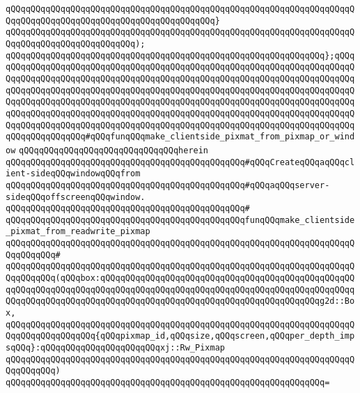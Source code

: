 \verb|qQQqqQQqqQQqqQQqqQQqqQQqqQQqqQQqqQQqqQQqqQQqqQQqqQQqqQQqqQQqqQQqqQQqqQQqqQQqqQQqqQQqqQQqqQQqqQQqqQQqqQQqqQQqqQQq}|\newline
\verb|qQQqqQQqqQQqqQQqqQQqqQQqqQQqqQQqqQQqqQQqqQQqqQQqqQQqqQQqqQQqqQQqqQQqqQQqqQQqqQQqqQQqqQQqqQQqqQQq);|\newline
\verb|qQQqqQQqqQQqqQQqqQQqqQQqqQQqqQQqqQQqqQQqqQQqqQQqqQQqqQQqqQQqqQQq};qQQqqQQqqQQqqQQqqQQqqQQqqQQqqQQqqQQqqQQqqQQqqQQqqQQqqQQqqQQqqQQqqQQqqQQqqQQqqQQqqQQqqQQqqQQqqQQqqQQqqQQqqQQqqQQqqQQqqQQqqQQqqQQqqQQqqQQqqQQqqQQqqQQqqQQqqQQqqQQqqQQqqQQqqQQqqQQqqQQqqQQqqQQqqQQqqQQqqQQqqQQqqQQqqQQqqQQqqQQqqQQqqQQqqQQqqQQqqQQqqQQqqQQqqQQqqQQqqQQqqQQqqQQqqQQqqQQqqQQqqQQqqQQqqQQqqQQqqQQqqQQqqQQqqQQqqQQqqQQqqQQqqQQqqQQqqQQqqQQqqQQqqQQqqQQqqQQqqQQqqQQqqQQqqQQqqQQqqQQqqQQqqQQqqQQqqQQqqQQqqQQqqQQqqQQqqQQqqQQqqQQqqQQqqQQqqQQqqQQq#qQQqfunqQQqmake_clientside_pixmat_from_pixmap_or_window|\newline
\newline
\verb|qQQqqQQqqQQqqQQqqQQqqQQqqQQqqQQqherein|\newline
\newline
\verb|qQQqqQQqqQQqqQQqqQQqqQQqqQQqqQQqqQQqqQQqqQQqqQQq#qQQqCreateqQQqaqQQqclient-sideqQQqwindowqQQqfrom|\newline
\verb|qQQqqQQqqQQqqQQqqQQqqQQqqQQqqQQqqQQqqQQqqQQqqQQq#qQQqaqQQqserver-sideqQQqoffscreenqQQqwindow.|\newline
\verb|qQQqqQQqqQQqqQQqqQQqqQQqqQQqqQQqqQQqqQQqqQQqqQQq#|\newline
\verb|qQQqqQQqqQQqqQQqqQQqqQQqqQQqqQQqqQQqqQQqqQQqqQQqfunqQQqmake_clientside_pixmat_from_readwrite_pixmap|\newline
\verb|qQQqqQQqqQQqqQQqqQQqqQQqqQQqqQQqqQQqqQQqqQQqqQQqqQQqqQQqqQQqqQQqqQQqqQQqqQQqqQQq#|\newline
\verb|qQQqqQQqqQQqqQQqqQQqqQQqqQQqqQQqqQQqqQQqqQQqqQQqqQQqqQQqqQQqqQQqqQQqqQQqqQQqqQQq(qQQqbox:qQQqqQQqqQQqqQQqqQQqqQQqqQQqqQQqqQQqqQQqqQQqqQQqqQQqqQQqqQQqqQQqqQQqqQQqqQQqqQQqqQQqqQQqqQQqqQQqqQQqqQQqqQQqqQQqqQQqqQQqqQQqqQQqqQQqqQQqqQQqqQQqqQQqqQQqqQQqqQQqqQQqqQQqqQQqqQQqqQQqqQQqg2d::Box,|\newline
\verb|qQQqqQQqqQQqqQQqqQQqqQQqqQQqqQQqqQQqqQQqqQQqqQQqqQQqqQQqqQQqqQQqqQQqqQQqqQQqqQQqqQQqqQQq{qQQqpixmap_id,qQQqsize,qQQqscreen,qQQqper_depth_impsqQQq}:qQQqqQQqqQQqqQQqqQQqqQQqxj::Rw_Pixmap|\newline
\verb|qQQqqQQqqQQqqQQqqQQqqQQqqQQqqQQqqQQqqQQqqQQqqQQqqQQqqQQqqQQqqQQqqQQqqQQqqQQqqQQq)|\newline
\verb|qQQqqQQqqQQqqQQqqQQqqQQqqQQqqQQqqQQqqQQqqQQqqQQqqQQqqQQqqQQqqQQq=|\newline
